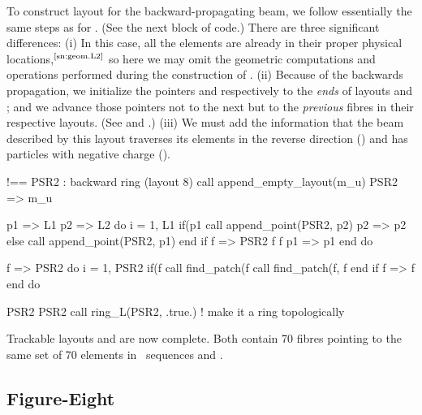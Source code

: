 To construct layout  for the backward-propagating beam,
we follow essentially the same steps as for . (See the
next block of code.) There are three significant differences:
(i) In this case, all the elements are already in their proper
physical locations,${}^\text{\ref{sn:geom.L2}}$ so here we may
omit the geometric computations
and operations performed during the construction of .
(ii) Because of the backwards propagation, we initialize the
pointers  and  respectively to the \emph{ends} of
layouts  and ; and we advance those pointers not
to the next but to the \emph{previous} fibres in their respective
layouts. (See  and .)
(iii) We must add the information that the beam described by this
layout traverses its elements in the reverse direction
() and has particles with negative charge
().%
%
\begin{ptccode}
!== PSR2 : backward ring (layout 8)
call append_empty_layout(m_u)
PSR2 => m_u%

p1 => L1%
p2 => L2%
do i = 1, L1%
  if(p1%
    call append_point(PSR2, p2)
    p2 => p2%
  else
    call append_point(PSR2, p1)
  end if
  f => PSR2%
  f%
  f%
  p1 => p1%
end do

f => PSR2%
do i = 1, PSR2%
  if(f%
    call find_patch(f%
    call find_patch(f, f%
  end if
  f => f%
end do

PSR2%
PSR2%
call ring_L(PSR2, .true.) ! make it a ring topologically
\end{ptccode}

Trackable layouts  and  are now complete.
Both contain 70 fibres pointing to the same set of 70 elements
in \DNA\ sequences  and .


\subsection{Figure-Eight}


